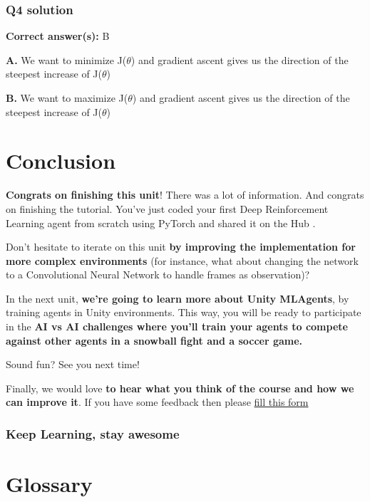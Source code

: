 \documentclass[11pt,a4paper]{article}
\begin{document}
\subsubsection{Q4 solution}\label{q4-solution}

\textbf{Correct answer(s):} B

\textbf{A.} We want to minimize J(\(\theta\)) and gradient ascent gives us the direction of the steepest increase of J(\(\theta\))

\textbf{B.} We want to maximize J(\(\theta\)) and gradient ascent gives us the direction of the steepest increase of J(\(\theta\))

\section{Conclusion}\label{conclusion}

\textbf{Congrats on finishing this unit}! There was a lot of information. And congrats on finishing the tutorial. You've just coded your first Deep Reinforcement Learning agent from scratch using PyTorch and shared it on the Hub .

Don't hesitate to iterate on this unit \textbf{by improving the implementation for more complex environments} (for instance, what about changing the network to a Convolutional Neural Network to handle frames as observation)?

In the next unit, \textbf{we're going to learn more about Unity MLAgents}, by training agents in Unity environments. This way, you will be ready to participate in the \textbf{AI vs AI challenges where you'll train your agents to compete against other agents in a snowball fight and a soccer game.}

Sound fun? See you next time!

Finally, we would love \textbf{to hear what you think of the course and how we can improve it}. If you have some feedback then please \href{https://forms.gle/BzKXWzLAGZESGNaE9}{fill this form}

\subsubsection{Keep Learning, stay awesome}\label{keep-learning-stay-awesome-1}

\section{Glossary}\label{glossary}
\end{document}
